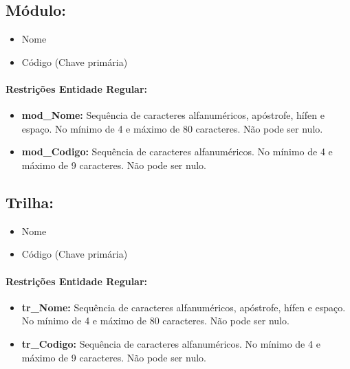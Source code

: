 \documentclass{report}
\begin{document}
\subsection{Módulo:}
\begin{itemize}
  \item Nome
  \item Código (Chave primária)
\end{itemize}
\paragraph{Restrições Entidade Regular:}
\begin{itemize}
  \item \textbf{mod\_Nome:} Sequência de caracteres alfanuméricos, apóstrofe, hífen e espaço. No mínimo de 4 e máximo de 80 caracteres. Não pode ser nulo.
  \item \textbf{mod\_Codigo:} Sequência de caracteres alfanuméricos. No mínimo de 4 e máximo de 9 caracteres. Não pode ser nulo.
\end{itemize}


\subsection{Trilha:}
\begin{itemize}
  \item Nome
  \item Código (Chave primária)
\end{itemize}
\paragraph{Restrições Entidade Regular:}
\begin{itemize}
  \item \textbf{tr\_Nome:} Sequência de caracteres alfanuméricos, apóstrofe, hífen e espaço. No mínimo de 4 e máximo de 80 caracteres. Não pode ser nulo.
  \item \textbf{tr\_Codigo:} Sequência de caracteres alfanuméricos. No mínimo de 4 e máximo de 9 caracteres. Não pode ser nulo.
\end{itemize}
\end{document}
